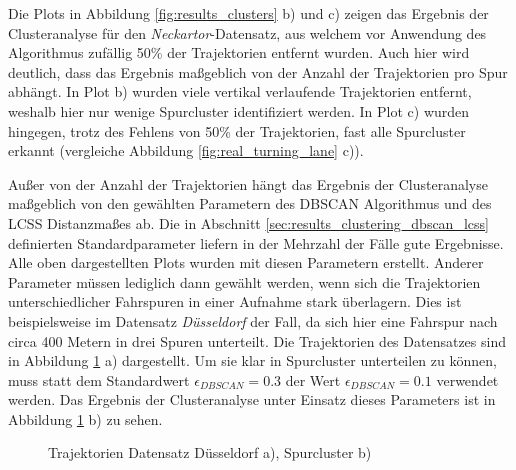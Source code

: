 Die Plots in Abbildung \ref{fig:results_clusters} b) und c) zeigen das Ergebnis der Clusteranalyse für
den \textit{Neckartor}-Datensatz, aus welchem vor Anwendung des Algorithmus zufällig 50\% der Trajektorien entfernt wurden.
Auch hier wird deutlich, dass das Ergebnis maßgeblich von der Anzahl der Trajektorien pro Spur abhängt.
In Plot b) wurden viele vertikal verlaufende Trajektorien entfernt, weshalb hier nur wenige Spurcluster identifiziert werden.
In Plot c) wurden hingegen, trotz des Fehlens von 50\% der Trajektorien, fast alle Spurcluster erkannt
(vergleiche Abbildung \ref{fig:real_turning_lane} c)).

Außer von der Anzahl der Trajektorien hängt das Ergebnis der Clusteranalyse maßgeblich von den gewählten
Parametern des DBSCAN Algorithmus und des LCSS Distanzmaßes ab. Die in Abschnitt \ref{sec:results_clustering_dbscan_lcss} definierten
Standardparameter liefern in der Mehrzahl der Fälle gute Ergebnisse. Alle oben dargestellten Plots
wurden mit diesen Parametern erstellt.
Anderer Parameter müssen lediglich dann gewählt werden, wenn sich die Trajektorien unterschiedlicher
Fahrspuren in einer Aufnahme stark überlagern.
Dies ist beispielsweise im Datensatz \textit{Düsseldorf} der Fall, da sich hier eine Fahrspur nach circa 400 Metern in drei Spuren unterteilt.
Die Trajektorien des Datensatzes sind in Abbildung \ref{fig:results_clusters_duesseldorf} a) dargestellt.
Um sie klar in Spurcluster unterteilen zu können, muss statt dem Standardwert
$\epsilon_{DBSCAN} = 0.3$ der Wert $\epsilon_{DBSCAN} = 0.1$ verwendet werden. Das Ergebnis der Clusteranalyse
unter Einsatz dieses Parameters ist in Abbildung \ref{fig:results_clusters_duesseldorf} b) zu sehen.

\begin{figure}[H]
    \centering
    \qquad \qquad
    \caption[Ergebnis Clusteranalyse Düsseldorf Datensatz]{Trajektorien Datensatz Düsseldorf a), Spurcluster b)}
    \label{fig:results_clusters_duesseldorf}
\end{figure}

